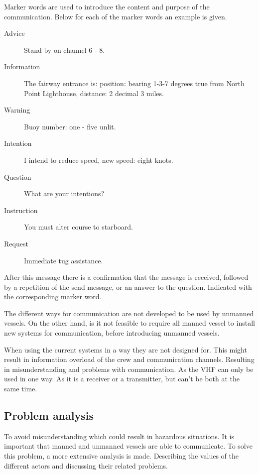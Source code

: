 Marker words are used to introduce the content and purpose of the communication. Below for each of the marker words an example is given.
\begin{description}
	\item [Advice] Stand by on channel 6 - 8.
	\item [Information] The fairway entrance is: position: bearing 1-3-7 degrees true from North Point Lighthouse, distance: 2 decimal 3 miles.
	\item [Warning] Buoy number: one - five unlit.
	\item [Intention] I intend to reduce speed, new speed: eight knots.
	\item [Question] What are your intentions?
	\item [Instruction] You must alter course to starboard.
	\item [Request] Immediate tug assistance.
\end{description}
After this message there is a confirmation that the message is received, followed by a repetition of the send message, or an answer to the question. Indicated with the corresponding marker word.

The different ways for communication are not developed to be used by unmanned vessels. On the other hand, is it not feasible to require all manned vessel to install new systems for communication, before introducing unmanned vessels.

When using the current systems in a way they are not designed for. This might result in information overload of the crew and communication channels. Resulting in misunderstanding and problems with communication. As the \ac{VHF} can only be used in one way. As it is a receiver or a transmitter, but can't be both at the same time. 

\subsection{Problem analysis}
To avoid misunderstanding which could result in hazardous situations. It is important that manned and unmanned vessels are able to communicate. To solve this problem, a more extensive analysis is made. 
Describing the values of the different actors and discussing their related problems.

